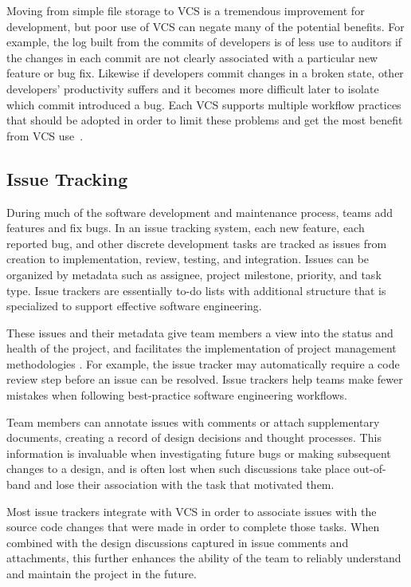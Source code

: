 Moving from simple file storage to VCS is a tremendous improvement for
development, but poor use of VCS can negate many of the potential
benefits. For example, the log built from the commits of developers is
of less use to auditors if the changes in each commit are not clearly
associated with a particular new feature or bug fix. Likewise if
developers commit changes in a broken state, other developers'
productivity suffers and it becomes more difficult later to isolate
which commit introduced a bug. Each VCS supports multiple workflow
practices that should be adopted in order to limit these problems and
get the most benefit from VCS
use~\cite{atlassianworkflow,pilato2008version}.

\subsection{Issue Tracking}

During much of the software development and maintenance process, teams
add features and fix bugs. In an issue tracking system, each new
feature, each reported bug, and other discrete development tasks are
tracked as issues from creation to implementation, review, testing,
and integration. Issues can be organized by metadata such as assignee,
project milestone, priority, and task type. Issue trackers are
essentially to-do lists with additional structure that is specialized
to support effective software engineering.

These issues and their metadata give team members a view into the
status and health of the project, and facilitates the implementation
of project management methodologies . For example, the issue tracker may automatically require a
code review step before an issue can be resolved. Issue trackers help
teams make fewer mistakes when following best-practice software
engineering workflows.

Team members can annotate issues with comments or attach supplementary
documents, creating a record of design decisions and thought
processes. This information is invaluable when investigating future
bugs or making subsequent changes to a design, and is often lost when
such discussions take place out-of-band and lose their association
with the task that motivated them.

Most issue trackers integrate with VCS in order to associate issues
with the source code changes that were made in order to complete those
tasks. When combined with the design discussions captured in issue
comments and attachments, this further enhances the ability of the
team to reliably understand and maintain the project in the future.

